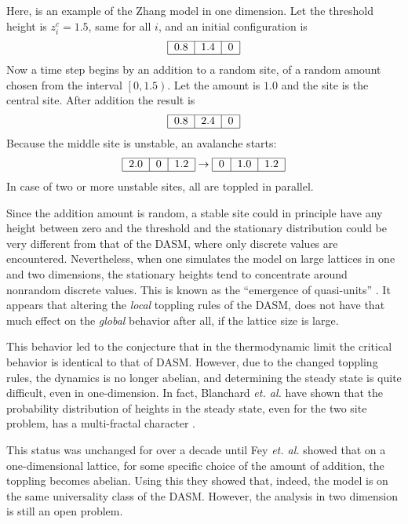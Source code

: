 \documentclass[11pt,a4paper]{book}
\begin{document}
Here, is an example of the Zhang model in one dimension. Let the
threshold height is $z_{i}^{c}=1.5$, same for all $i$, and an initial configuration is
$$
\begin{tabular}{|c|c|c|}
\hline
0.8 & 1.4 & 0 \\
\hline
\end{tabular}
$$
Now a time step begins by an addition to a random site, of a random
amount chosen from the interval $\left[ 0,1.5 \right)$. Let the amount
is $1.0$ and the site is the central site. After addition the result
is
$$
\begin{tabular}{|c|c|c|}
\hline
0.8 & 2.4 & 0 \\
\hline
\end{tabular}
$$
Because the middle site is unstable, an avalanche starts:
$$
\begin{tabular}{|c|c|c|}
\hline
2.0 & 0 & 1.2 \\
\hline
\end{tabular}
\rightarrow
\begin{tabular}{|c|c|c|}
\hline
0 & 1.0 & 1.2 \\
\hline
\end{tabular}
$$
In case of two or more unstable sites, all are toppled in parallel.

Since the addition amount is random, a stable site could in principle
have any height between zero and the threshold and the stationary
distribution could be very different from that of the DASM, where
only
discrete values are encountered. Nevertheless, when one simulates the
model on large lattices in one and two dimensions, the stationary
heights tend to concentrate around nonrandom discrete values. This is
known as the ``emergence of quasi-units'' \cite{zhang}. It appears that altering
the \textit{local} toppling rules of the DASM, does not have that much effect on the
\textit{global} behavior after all, if the lattice size is large.

This behavior led to the conjecture that in the thermodynamic limit
the critical behavior is identical to that of DASM. However, due to the
changed toppling rules, the dynamics is no longer
abelian,
and determining the steady state is quite difficult, even in
one-dimension. In fact, Blanchard \textit{et. al.} have shown that the
probability distribution of heights in the steady state, even for the
two site problem, has a multi-fractal character
\cite{blanchard}.

This status was unchanged for over a decade until Fey
\textit{et. al.} showed that on a one-dimensional lattice, for some
specific choice of the amount of addition, the toppling becomes
abelian. Using this they showed that, indeed, the model is on the same
universality class of the DASM. However, the analysis in two dimension
is still an open problem.
\end{document}
